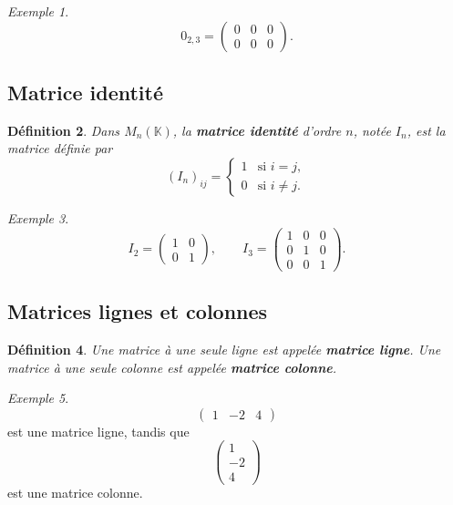 \documentclass[11pt,a4paper]{article}
\newtheorem{definition}{Définition}[section]
\theoremstyle{remark}
\newtheorem{exemple}[definition]{Exemple}
\newcommand{\K}{\mathbb{K}}
\begin{document}
\begin{exemple}
\[
0_{2,3}=
\begin{pmatrix}
0 & 0 & 0\\
0 & 0 & 0
\end{pmatrix}.
\]
\end{exemple}

\subsection{Matrice identité}

\begin{definition}
Dans \(M_n(\K)\), la \textbf{matrice identité} d’ordre \(n\), notée \(I_n\), est la matrice définie par
\[
(I_n)_{ij}=
\begin{cases}
1 & \text{si } i=j,\\
0 & \text{si } i\neq j.
\end{cases}
\]
\end{definition}

\begin{exemple}
\[
I_2=
\begin{pmatrix}
1 & 0\\
0 & 1
\end{pmatrix},
\qquad
I_3=
\begin{pmatrix}
1 & 0 & 0\\
0 & 1 & 0\\
0 & 0 & 1
\end{pmatrix}.
\]
\end{exemple}

\subsection{Matrices lignes et colonnes}

\begin{definition}
Une matrice à une seule ligne est appelée \textbf{matrice ligne}.  
Une matrice à une seule colonne est appelée \textbf{matrice colonne}.
\end{definition}

\begin{exemple}
\[
\begin{pmatrix}
1 & -2 & 4
\end{pmatrix}
\]
est une matrice ligne, tandis que
\[
\begin{pmatrix}
1\\
-2\\
4
\end{pmatrix}
\]
est une matrice colonne.
\end{exemple}
\end{document}
